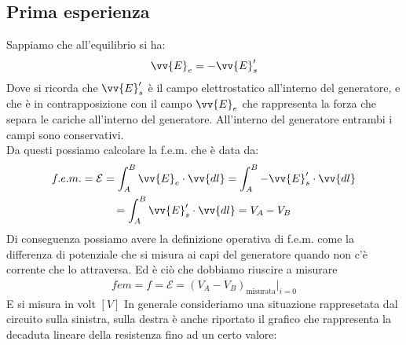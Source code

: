 \documentclass[a4paper, oneside]{article}
\newcommand{\E}{\mathcal{E}}
\begin{document}
\subsection{Prima esperienza}
\begin{figure}
    \end{figure}\noindent
Sappiamo che all'equilibrio si ha:
\begin{gather*}
    \vv{E}_e = -\vv{E}'_s
\end{gather*}
Dove si ricorda che $\vv{E}'_s$ è il campo elettrostatico all'interno del generatore, e che è in contrapposizione con il campo $\vv{E}_e$ che rappresenta la forza che separa le cariche all'interno del generatore. All'interno del 
generatore entrambi i campi sono conservativi.\\
Da questi possiamo calcolare la f.e.m. che è data da:
\begin{gather*}
    f.e.m. = \E = \int_{A}^{B} \vv{E}_e \cdot \vv{dl} = \int_{A}^{B} -\vv{E}'_s \cdot \vv{dl}\\
    = \int_{A}^{B} \vv{E}'_s \cdot \vv{dl} = V_A-V_B
\end{gather*}
Di conseguenza possiamo avere la definizione operativa di f.e.m. come la differenza di potenziale che si misura ai capi del generatore quando non c'è corrente che lo attraversa. Ed è ciò che dobbiamo riuscire a misurare\\
\begin{gather*}
    fem = f = \mathcal{E} = (V_A - V_B)_\text{misurata} \vert_{i=0}
\end{gather*}
E si misura in volt $[V]$
In generale consideriamo una situazione rappresetata dal circuito sulla sinistra, sulla destra è anche riportato il grafico che rappresenta la decaduta lineare della resistenza fino ad un certo valore:
\end{document}
